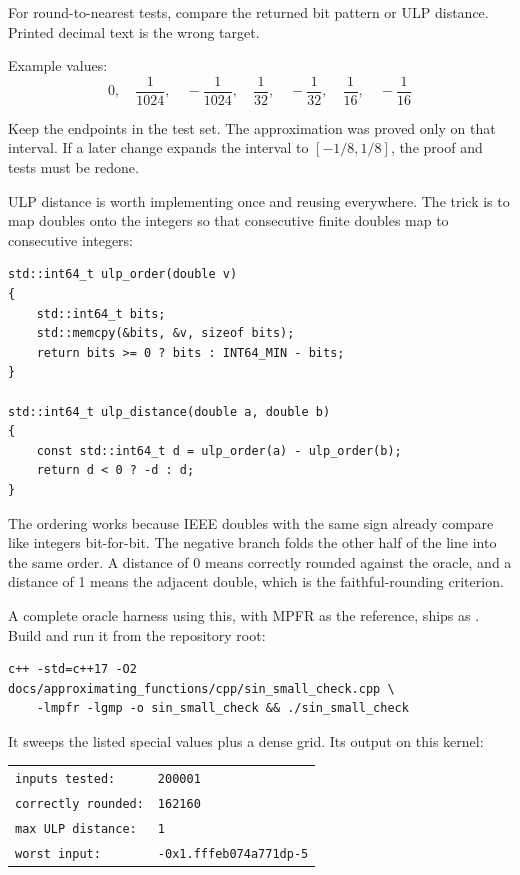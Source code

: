 \documentclass[manuscript, nonacm]{acmart}
\begin{document}
    For round-to-nearest tests, compare the returned bit pattern or ULP distance.
    Printed decimal text is the wrong target.

    Example values:
    \[
        0,\quad \frac{1}{1024},\quad -\frac{1}{1024},\quad \frac{1}{32},\quad
        -\frac{1}{32},\quad \frac{1}{16},\quad -\frac{1}{16}
    \]

    Keep the endpoints in the test set. The approximation was proved only on that
    interval. If a later change expands the interval to $[-1/8,1/8]$, the proof
    and tests must be redone.

    ULP distance is worth implementing once and reusing everywhere. The
    trick is to map doubles onto the integers so that consecutive finite
    doubles map to consecutive integers:

    \begin{lstlisting}[style=cpp]
std::int64_t ulp_order(double v)
{
    std::int64_t bits;
    std::memcpy(&bits, &v, sizeof bits);
    return bits >= 0 ? bits : INT64_MIN - bits;
}

std::int64_t ulp_distance(double a, double b)
{
    const std::int64_t d = ulp_order(a) - ulp_order(b);
    return d < 0 ? -d : d;
}
    \end{lstlisting}

    The ordering works because IEEE doubles with the same sign already compare like
    integers bit-for-bit. The negative branch folds the other half of the line into
    the same order. A distance of 0 means correctly rounded against the oracle, and
    a distance of 1 means the adjacent double, which is the faithful-rounding
    criterion.

    A complete oracle harness using this, with MPFR as the reference, ships
    as . Build and
    run it from the repository root:
    \begin{lstlisting}[style=shell]
c++ -std=c++17 -O2 docs/approximating_functions/cpp/sin_small_check.cpp \
    -lmpfr -lgmp -o sin_small_check && ./sin_small_check
    \end{lstlisting}
    It sweeps the listed special values plus a dense grid. Its output on this
    kernel:

    \begin{center}
        \begin{tabular}{@{}ll@{}}
            \texttt{inputs tested:}     & \texttt{200001}                \\
            \texttt{correctly rounded:} & \texttt{162160}                \\
            \texttt{max ULP distance:}  & \texttt{1}                     \\
            \texttt{worst input:}       & \texttt{-0x1.fffeb074a771dp-5}
        \end{tabular}
    \end{center}
\end{document}
